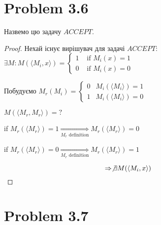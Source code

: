 \documentclass[12pt,letterpaper]{article}
\begin{document}
\section{Problem 3.6}

Назвемо цю задачу $ACCEPT$.

\begin{proof}
    Нехай існує вирішувач для задачі $ACCEPT$: $\exists M : M(\langle M_i, x \rangle) = \begin{cases}
        1 & \text{ if } M_i(x) = 1 \\
        0 & \text{ if } M_i(x) = 0
    \end{cases}$

    Побудуємо $M_r(M_i) = \begin{cases}
        0 & M_i(\langle M_i \rangle) = 1 \\
        1 & M_i(\langle M_i \rangle) = 0
    \end{cases}$

    $M(\langle M_r, M_r \rangle) = ?$

    if $M_r(\langle M_r \rangle) = 1 \underset{M_r \text{ definition}}{\Rightarrow} M_r(\langle M_r \rangle) = 0$

    if $M_r(\langle M_r \rangle) = 0 \underset{M_r \text{ definition}}{\Rightarrow} M_r(\langle M_r \rangle) = 1$

    \[ \Rightarrow \not\exists M(\langle M_i, x \rangle) \]
\end{proof}

\section{Problem 3.7}
\end{document}
